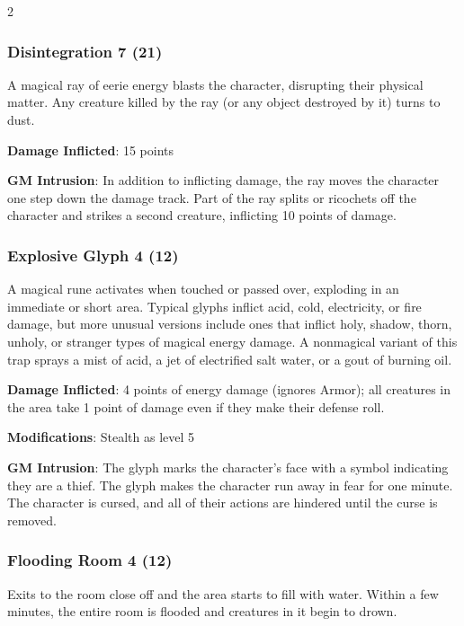 \begin{multicols}{2}
\subsubsection{Disintegration 7 (21)}

A magical ray of eerie energy blasts the character, disrupting their physical matter. Any creature killed by the ray (or any object destroyed by it) turns to dust. 

\textbf{Damage Inflicted}: 15 points 

\textbf{GM Intrusion}: In addition to inflicting damage, the ray moves the character one step down the damage track. Part of the ray splits or ricochets off the character and strikes a second creature, inflicting 10 points of damage. 

\subsubsection{Explosive Glyph 4 (12)}

A magical rune activates when touched or passed over, exploding in an immediate or short area. Typical glyphs inflict acid, cold, electricity, or fire damage, but more unusual versions include ones that inflict holy, shadow, thorn, unholy, or stranger types of magical energy damage. A nonmagical variant of this trap sprays a mist of acid, a jet of electrified salt water, or a gout of burning oil. 

\textbf{Damage Inflicted}: 4 points of energy damage (ignores Armor); all creatures in the area take 1 point of damage even if they make their defense roll. 

\textbf{Modifications}: Stealth as level 5 

\textbf{GM Intrusion}: The glyph marks the character’s face with a symbol indicating they are a thief. The glyph makes the character run away in fear for one minute. The character is cursed, and all of their actions are hindered until the curse is removed.

\subsubsection{Flooding Room 4 (12)}

Exits to the room close off and the area starts to fill with water. Within a few minutes, the entire room is flooded and creatures in it begin to drown. 


\end{multicols}
